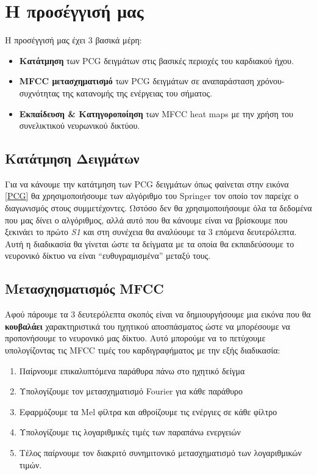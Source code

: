 \section{Η προσέγγισή μας}\label{our_approach}

Η προσέγγισή μας έχει 3 βασικά μέρη:
\begin{itemize}
	\item \textbf{Κατάτμηση} των PCG δειγμάτων στις βασικές περιοχές του καρδιακού
	      ήχου.
	\item \textbf{MFCC μετασχηματισμό} των PCG δειγμάτων σε αναπαράσταση
	      χρόνου-συχνότητας της κατανομής της ενέργειας του σήματος.
	\item \textbf{Εκπαίδευση \& Κατηγοροποίηση} των MFCC heat maps με την χρήση
	      του συνελικτικού νευρωνικού δικτύου.
\end{itemize}

\subsection{Κατάτμηση Δειγμάτων}

Για να κάνουμε την κατάτμηση των PCG δειγμάτων όπως φαίνεται στην εικόνα
\ref{PCG} θα χρησιμοποιήσουμε των αλγόριθμο του Springer
\cite{springer2015logistic} τον οποίο τον παρείχε ο διαγωνισμός στους
συμμετέχοντες. Ωστόσο δεν θα χρησιμοποιήσουμε όλα τα δεδομένα που μας δίνει ο
αλγόριθμος, αλλά αυτό που θα κάνουμε είναι να βρίσκουμε που ξεκινάει το πρώτο
\emph{S1} και στη συνέχεια θα αναλύουμε τα 3 επόμενα δευτερόλεπτα. Αυτή η
διαδικασία θα γίνεται ώστε τα δείγματα με τα οποία θα εκπαιδεύσουμε το νευρονικό
δίκτυο να είναι ``ευθυγραμισμένα'' μεταξύ τους.


\subsection{Μετασχησματισμός MFCC}

Αφού πάρουμε τα 3 δευτερόλεπτα σκοπός είναι να δημιουργήσουμε μια εικόνα που θα
\textbf{κουβαλάει} χαρακτηριστικά του ηχητικού αποσπάσματος ώστε να μπορέσουμε 
να προπονήσουμε το νευρονικό μας δίκτυο. Αυτό μπορούμε να το πετύχουμε υπολογίζοντας
τις MFCC τιμές του καρδιγραφήματος με την εξής διαδικασία:
\begin{enumerate}
  \item Παίρνουμε επικαλυπτόμενα παράθυρα πάνω στο ηχητικό δείγμα
  \item Υπολογίζουμε τον μετασχηματισμό Fourier για κάθε παράθυρο
  \item Εφαρμόζουμε τα Mel φίλτρα και αθροίζουμε τις ενέργιες σε κάθε φίλτρο
  \item Υπολογίζουμε τις λογαριθμικές τιμές των παραπάνω ενεργειών
  \item Τέλος παίρνουμε τον διακριτό συνημιτονικό μετασχηματισμό των λογαριθμικών
    τιμών.
\end{enumerate}

